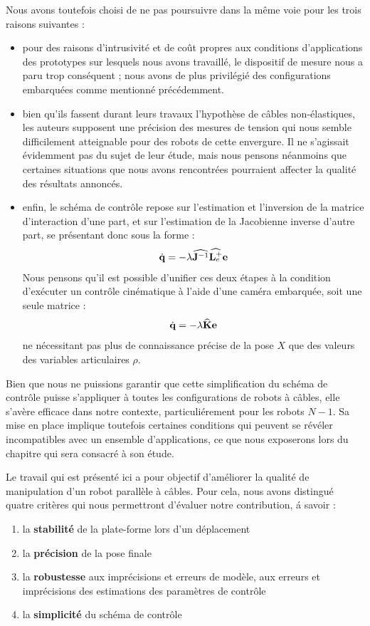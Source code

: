 Nous avons toutefois choisi de ne pas poursuivre dans la m\^eme voie pour
les trois raisons suivantes :
\begin{itemize}
 \item pour des raisons d'intrusivit\'e et de co\^ut propres aux conditions
d'applications des prototypes sur lesquels nous avons travaill\'e, le
dispositif de mesure nous a paru trop cons\'equent ; nous avons
de plus privil\'egi\'e des configurations embarqu\'ees comme mentionn\'e
pr\'ec\'edemment.
\item bien qu'ils fassent durant leurs travaux l'hypoth\`ese de c\^ables
non-\'elastiques, les auteurs supposent une pr\'ecision des mesures de tension
qui nous semble difficilement atteignable pour des robots de cette envergure. Il
ne s'agissait \'evidemment pas du sujet de leur \'etude, mais nous pensons
n\'eanmoins que certaines situations que nous avons rencontr\'ees pourraient
affecter la qualit\'e des r\'esultats annonc\'es. 
\item enfin, le sch\'ema de contr\^ole repose sur l'estimation et l'inversion
de la matrice d'interaction d'une part, et sur l'estimation de la Jacobienne
inverse d'autre part, se pr\'esentant donc sous la forme :
\begin{equation}
\dot {\bf q} = - \lambda \widehat {{\bf J}^{-1}} \widehat{ {\bf L}_e^+} {\bf e} 
\label{intro:eq25}
\end{equation}
Nous pensons qu'il est possible d'unifier ces deux \'etapes \`a la condition
d'ex\'ecuter un contr\^ole cin\'ematique \`a l'aide d'une cam\'era embarqu\'ee,
soit une seule matrice :
\begin{equation}
\dot {\bf q} = - \lambda \widehat {\bf K} {\bf e} 
\label{intro:eq26}
\end{equation}
ne n\'ecessitant pas plus de connaissance pr\'ecise de la pose $X$ que des
valeurs des variables articulaires $\rho$.
\end{itemize}

Bien que nous ne puissions garantir que cette simplification du sch\'ema de
contr\^ole puisse s'appliquer \`a toutes les configurations de robots \`a
c\^ables, elle s'av\`ere efficace dans notre contexte, particuli\'erement pour
les robots $N-1$. Sa mise en place implique toutefois certaines conditions qui
peuvent se r\'ev\'eler incompatibles avec un ensemble d'applications, ce que
nous exposerons lors du chapitre qui sera consacr\'e \`a son \'etude.

Le travail qui est pr\'esent\'e ici a pour objectif d'am\'eliorer la qualit\'e
de manipulation d'un robot parall\`ele \`a c\^ables. Pour cela, nous avons
distingu\'e quatre crit\`eres qui nous permettront d'\'evaluer notre
contribution, \'a savoir :
\begin{enumerate}
 \item la {\bf stabilit\'e} de la plate-forme lors d'un d\'eplacement
 \item la {\bf pr\'ecision} de la pose finale
 \item la {\bf robustesse} aux impr\'ecisions et erreurs de mod\`ele, aux
erreurs et impr\'ecisions des estimations des param\`etres de contr\^ole
  \item la {\bf simplicit\'e} du sch\'ema de contr\^ole
\end{enumerate}

